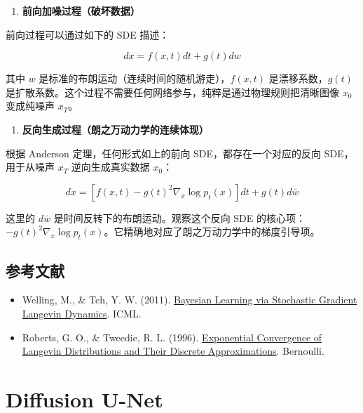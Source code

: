 \begin{enumerate}
\def\labelenumi{\arabic{enumi}.}
\tightlist
\item
  \textbf{前向加噪过程（破坏数据）}
\end{enumerate}

前向过程可以通过如下的 SDE 描述：

\[
dx=f(x,t)dt+g(t)dw
\]

其中 \(w\) 是标准的布朗运动（连续时间的随机游走），\(f(x,t)\) 是漂移系数，\(g(t)\) 是扩散系数。这个过程不需要任何网络参与，纯粹是通过物理规则把清晰图像 \(x_0\) 变成纯噪声 \(x_T\)。

\begin{enumerate}
\def\labelenumi{\arabic{enumi}.}
\setcounter{enumi}{1}
\tightlist
\item
  \textbf{反向生成过程（朗之万动力学的连续体现）}
\end{enumerate}

根据 Anderson 定理，任何形式如上的前向 SDE，都存在一个对应的反向 SDE，用于从噪声 \(x_T\) 逆向生成真实数据 \(x_0\)：

\[
dx=\left[f(x,t)-g(t)^2\nabla_x\log p_t(x)\right]dt+g(t)d\bar{w}
\]

这里的 \(d\bar{w}\) 是时间反转下的布朗运动。观察这个反向 SDE 的核心项：\(-g(t)^2\nabla_x\log p_t(x)\)。它精确地对应了朗之万动力学中的梯度引导项。

\hypertarget{ux53c2ux8003ux6587ux732e-155}{%
\subsection{参考文献}\label{ux53c2ux8003ux6587ux732e-155}}

\begin{itemize}
\tightlist
\item
  Welling, M., \& Teh, Y. W. (2011). \href{https://www.stats.ox.ac.uk/~teh/research/compstats/WelTeh2011a.pdf}{Bayesian Learning via Stochastic Gradient Langevin Dynamics}. ICML.
\item
  Roberts, G. O., \& Tweedie, R. L. (1996). \href{https://doi.org/10.2307/3318418}{Exponential Convergence of Langevin Distributions and Their Discrete Approximations}. Bernoulli.
\end{itemize}

\clearpage

\hypertarget{diffusion-u-net}{%
\section{Diffusion U-Net}\label{diffusion-u-net}}

